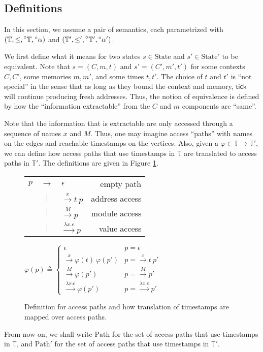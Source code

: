 \documentclass{article}
\theoremstyle{definition}
\newcommand*{\A}[1]{\prescript{\circ}{}{#1}}
\newcommand*{\Time}{\mathbb{T}}
\newcommand*{\ATime}{\A{\Time}}
\newcommand*{\mem}{m}
\newcommand*{\State}{\text{State}}
\newcommand*{\Path}{\text{Path}}
\newcommand*{\tick}{\mathsf{tick}}
\begin{document}
\subsection{Definitions}
In this section, we assume a pair of semantics, each parametrized with $(\Time,\le,\ATime,\A\alpha)$ and $(\Time',\le',\ATime',\A\alpha')$.

We first define what it means for two states $s\in\State$ and $s'\in\State'$ to be equivalent.
Note that $s=(C,\mem,t)$ and $s'=(C',\mem',t')$ for some contexts $C,C'$, some memories $\mem,\mem'$, and some times $t,t'$.
The choice of $t$ and $t'$ is ``not special'' in the sense that as long as they bound the context and memory, $\tick$ will continue producing fresh addresses.
Thus, the notion of equivalence is defined by how the ``information extractable'' from the $C$ and $\mem$ components are ``same''.

Note that the information that is extractable are only accessed through a sequence of names $x$ and $M$.
Thus, one may imagine access ``paths'' with names on the edges and reachable timestamps on the vertices.
Also, given a $\varphi\in\Time\rightarrow\Time'$, we can define how access paths that use timestamps in $\Time$ are translated to access paths in $\Time'$.
The definitions are given in Figure \ref{fig:accpath}.
\begin{figure}[h!]
  \centering
  \begin{tabular}{rclr}
    $p$ & $\rightarrow$ & $\epsilon$                   & empty path     \\
        & $|$           & $\xrightarrow{x}t\:p$        & address access \\
        & $|$           & $\xrightarrow{M}p$           & module access  \\
        & $|$           & $\xrightarrow{\lambda x.e}p$ & value access
  \end{tabular}\:
  $
    \varphi(p)\triangleq
    \begin{cases}
      \epsilon                               & p=\epsilon                    \\
      \xrightarrow{x}\varphi(t)\:\varphi(p') & p=\xrightarrow{x}t\:p'        \\
      \xrightarrow{M}\varphi(p')             & p=\xrightarrow{M}p'           \\
      \xrightarrow{\lambda x.e}\varphi(p')   & p=\xrightarrow{\lambda x.e}p'
    \end{cases}
  $
  \caption{Definition for access paths and how translation of timestamps are mapped over access paths.}
  \label{fig:accpath}
\end{figure}
From now on, we shall write $\Path$ for the set of access paths that use timestamps in $\Time$, and $\Path'$ for the set of access paths that use timestamps in $\Time'$.
\end{document}

